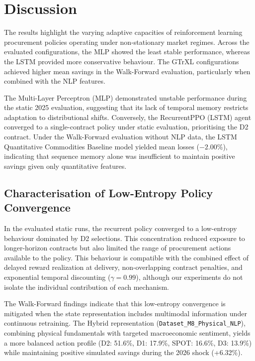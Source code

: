 \section{Discussion}
\label{sec:discussion}

The results highlight the varying adaptive capacities of reinforcement learning procurement policies operating under non-stationary market regimes. Across the evaluated configurations, the MLP showed the least stable performance, whereas the LSTM provided more conservative behaviour. The GTrXL configurations achieved higher mean savings in the Walk-Forward evaluation, particularly when combined with the NLP features.

The Multi-Layer Perceptron (MLP) demonstrated unstable performance during the static 2025 evaluation, suggesting that its lack of temporal memory restricts adaptation to distributional shifts. Conversely, the RecurrentPPO (LSTM) agent converged to a single-contract policy under static evaluation, prioritising the D2 contract. Under the Walk-Forward evaluation without NLP data, the LSTM Quantitative Commodities Baseline model yielded mean losses ($-2.00\%$), indicating that sequence memory alone was insufficient to maintain positive savings given only quantitative features.

\subsection{Characterisation of Low-Entropy Policy Convergence}

In the evaluated static runs, the recurrent policy converged to a low-entropy behaviour dominated by D2 selections. This concentration reduced exposure to longer-horizon contracts but also limited the range of procurement actions available to the policy. This behaviour is compatible with the combined effect of delayed reward realization at delivery, non-overlapping contract penalties, and exponential temporal discounting ($\gamma=0.99$), although our experiments do not isolate the individual contribution of each mechanism.

The Walk-Forward findings indicate that this low-entropy convergence is mitigated when the state representation includes multimodal information under continuous retraining. The Hybrid representation (\texttt{Dataset\_M8\_Physical\_NLP}), combining physical fundamentals with targeted macroeconomic sentiment, yields a more balanced action profile (D2: 51.6\%, D1: 17.9\%, SPOT: 16.6\%, D3: 13.9\%) while maintaining positive simulated savings during the 2026 shock (+6.32\%).

